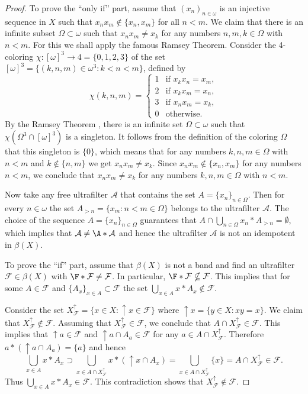 \documentclass{amsart}
\theoremstyle{definition}
\begin{document}
\begin{proof} To prove the ``only if'' part, assume that $(x_n)_{n\in{\omega}}$ is an injective sequence in $X$ such that $x_nx_m\notin\{x_n,x_m\}$ for all $n<m$. We claim that there is an infinite subset $\Omega\subset {\omega}$ such that $x_nx_m\ne x_k$ for any numbers $n,m,k\in\Omega$ with $n<m$.
For this we shall apply the famous Ramsey Theorem. Consider the 4-coloring $\chi:[{\omega}]^3\to 4=\{0,1,2,3\}$ of the set $[{\omega}]^3=\{(k,n,m)\in{\omega}^3:k<n<m\}$, defined by
$$\chi(k,n,m)=\begin{cases}
1 &\mbox{if $x_kx_n=x_m$},\\
2 &\mbox{if $x_kx_m=x_n$},\\
3 &\mbox{if $x_nx_m=x_k$},\\
0 &\mbox{otherwise}.
\end{cases}
$$By the Ramsey Theorem \cite[5.1]{P}, there is an infinite set $\Omega\subset{\omega}$ such that $\chi(\Omega^3\cap[{\omega}]^3)$ is a singleton. It follows from the definition of the coloring $\Omega$ that this singleton is $\{0\}$, which means that for any numbers $k,n,m\in\Omega$ with $n<m$ and $k\notin\{n,m\}$ we get $x_nx_m\ne x_k$. Since $x_nx_m\notin\{x_n,x_m\}$ for any numbers $n<m$, we conclude that $x_nx_m\ne x_k$ for any numbers $k,n,m\in\Omega$ with $n<m$.

Now take any free ultrafilter ${\mathcal A}$ that contains the set $A=\{x_n\}_{n\in\Omega}$. Then for every $n\in{\omega}$ the set $A_{>n}=\{x_m:n<m\in\Omega\}$ belongs to the ultrafilter ${\mathcal A}$. The choice of the sequence $A=\{x_n\}_{n\in\Omega}$ guarantees that $A\cap \bigcup_{n\in\Omega}x_n*A_{>n}=\emptyset$, which implies that ${\mathcal A}\ne\A*{\mathcal A}$ and hence the ultrafilter ${\mathcal A}$ is not an idempotent in $\beta(X)$.
\smallskip

To prove the ``if'' part, assume that $\beta(X)$ is not a band and find an ultrafilter ${\mathcal {F}}\in\beta(X)$ with $\F*{\mathcal {F}}\neq{\mathcal {F}}$. In particular,
$\F*{\mathcal {F}}\nsubseteq{\mathcal {F}}$. This implies that for some $A\in{\mathcal {F}}$ and
$\{A_x\}_{x\in A}\subset{\mathcal {F}}$ the set $\bigcup_{x\in
A}x{*}A_x\notin{\mathcal {F}}$.

Consider the set $X^{\uparrow}_{\mathcal {F}}=\{x\in X: {\uparrow}x\in{\mathcal {F}}\}$ where ${\uparrow}x=\{y\in X:xy=x\}$.
We claim that $X^{\uparrow}_{\mathcal {F}}\notin{\mathcal {F}}$. Assuming that
$X^{\uparrow}_{\mathcal {F}}\in{\mathcal {F}}$, we conclude that $A\cap X^{\uparrow}_{\mathcal {F}}\in{\mathcal {F}}$.
This implies that ${\uparrow}a\in{\mathcal {F}}$ and ${\uparrow}a\cap
A_a\in{\mathcal {F}}$ for any $a\in A\cap X^{\uparrow}_{\mathcal {F}}$. Therefore
$a*({\uparrow}a\cap A_a)=\{a\}$ and hence $$\bigcup_{x\in
A}x*A_x\supset\bigcup_{x\in A\cap
X^{\uparrow}_{\mathcal {F}}}x*({\uparrow}x\cap A_x)=\bigcup_{x\in A\cap
X^{\uparrow}_{\mathcal {F}}}\{x\}=A\cap X^{\uparrow}_{\mathcal {F}}\in{\mathcal {F}}.$$ Thus
$\bigcup_{x\in A}x{*}A_x\in{\mathcal {F}}$. This contradiction shows that $X^{\uparrow}_{\mathcal {F}}\notin{\mathcal {F}}$.


\end{proof}
\end{document}
